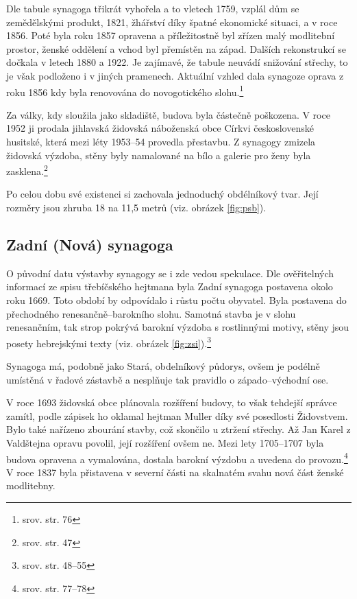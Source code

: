 \documentclass[a4paper,oneside,12pt]{report}
\begin{document}
Dle tabule synagoga třikrát vyhořela a to vletech 1759, vzplál dům se zemědělskými produkt, 1821, žhářství díky špatné ekonomické situaci, a v roce 1856.
Poté byla roku 1857 opravena a příležitostně byl zřízen malý modlitební prostor, ženské oddělení a vchod byl přemístěn na západ.
Dalších rekonstrukcí se dočkala v letech 1880 a 1922.
Je zajímavé, že tabule neuvádí snižování střechy, to je však podloženo i v jiných pramenech.
Aktuální vzhled dala synagoze oprava z roku 1856 kdy byla renovována do novogotického slohu.\footnote{srov. \cite{Fiser2005} str. 76}

Za války, kdy sloužila jako skladiště, budova byla částečně poškozena.
V roce 1952 ji prodala jihlavská židovská náboženská obce Církvi československé husitské, která mezi léty 1953--54 provedla přestavbu.
Z synagogy zmizela židovská výzdoba, stěny byly namalované na bílo a galerie pro ženy byla zasklena.\footnote{srov. \cite{Klenovsky2003} str. 47}

Po celou dobu své existenci si zachovala jednoduchý obdélníkový tvar.
Její rozměry jsou zhruba 18 na 11,5 metrů (viz. obrázek \ref{fig:psb}).

\subsection{Zadní (Nová) synagoga}

O původní datu výstavby synagogy se i zde vedou spekulace.
Dle ověřitelných informací ze spisu třebíčského hejtmana byla Zadní synagoga postavena okolo roku 1669.
Toto období by odpovídalo i růstu počtu obyvatel.
Byla postavena do přechodného renesančně--barokního slohu.
Samotná stavba je v slohu renesančním, tak strop pokrývá barokní výzdoba s rostlinnými motivy, stěny jsou posety hebrejskými texty (viz. obrázek \ref{fig:zsi}).\footnote{srov. \cite{Klenovsky2003} str. 48--55}

Synagoga má, podobně jako Stará, obdelníkový půdorys, ovšem je podélně umístěná v řadové zástavbě a nesplňuje tak pravidlo o západo--východní ose.

V roce 1693 židovská obce plánovala rozšíření budovy, to však tehdejší správce zamítl, podle zápisek ho oklamal hejtman Muller díky své posedlosti Židovstvem.
Bylo také nařízeno zbourání stavby, což skončilo u ztržení střechy.
Až Jan Karel z Valdštejna opravu povolil, její rozšíření ovšem ne.
Mezi lety 1705--1707 byla budova opravena a vymalována, dostala barokní výzdobu a uvedena do provozu.\footnote{srov. \cite{Fiser2005} str. 77--78}
V roce 1837 byla přistavena v severní části na skalnatém svahu nová část ženské modlitebny.
\end{document}
